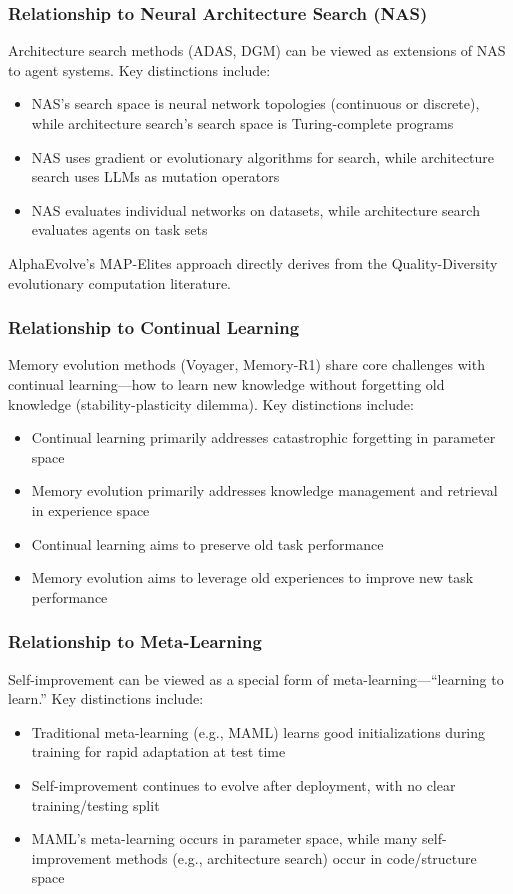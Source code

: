 \subsubsection{Relationship to Neural Architecture Search (NAS)}

Architecture search methods (ADAS, DGM) can be viewed as extensions of NAS to agent systems. Key distinctions include:
\begin{itemize}
\item NAS's search space is neural network topologies (continuous or discrete), while architecture search's search space is Turing-complete programs
\item NAS uses gradient or evolutionary algorithms for search, while architecture search uses LLMs as mutation operators
\item NAS evaluates individual networks on datasets, while architecture search evaluates agents on task sets
\end{itemize}

AlphaEvolve's MAP-Elites approach directly derives from the Quality-Diversity evolutionary computation literature.

\subsubsection{Relationship to Continual Learning}

Memory evolution methods (Voyager, Memory-R1) share core challenges with continual learning---how to learn new knowledge without forgetting old knowledge (stability-plasticity dilemma). Key distinctions include:
\begin{itemize}
\item Continual learning primarily addresses catastrophic forgetting in parameter space
\item Memory evolution primarily addresses knowledge management and retrieval in experience space
\item Continual learning aims to preserve old task performance
\item Memory evolution aims to leverage old experiences to improve new task performance
\end{itemize}

\subsubsection{Relationship to Meta-Learning}

Self-improvement can be viewed as a special form of meta-learning---``learning to learn.'' Key distinctions include:
\begin{itemize}
\item Traditional meta-learning (e.g., MAML) learns good initializations during training for rapid adaptation at test time
\item Self-improvement continues to evolve after deployment, with no clear training/testing split
\item MAML's meta-learning occurs in parameter space, while many self-improvement methods (e.g., architecture search) occur in code/structure space
\end{itemize}


